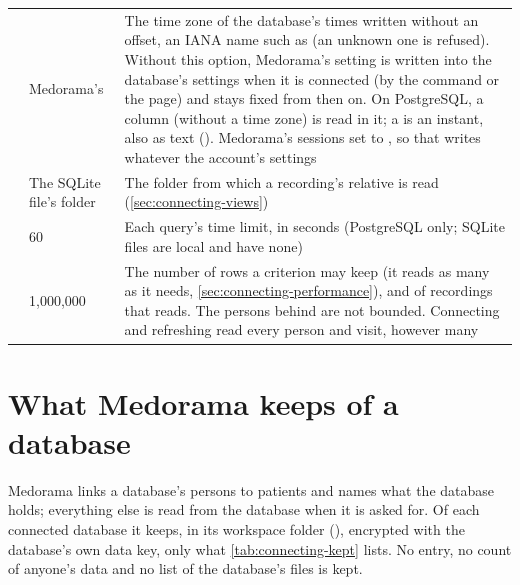 \begin{xltabular}{\linewidth}{@{}P{3.6cm}P{2.6cm}L@{}}
 & Medorama's & The time zone of the database's times written without an
  offset, an IANA name such as  (an unknown one is refused). Without this
  option, Medorama's  setting is written into the database's settings when it is
  connected (by the command or the page) and stays fixed from then on. On PostgreSQL, a
   column (without a time zone) is read in it; a  is an
  instant, also as text (). Medorama's sessions set
   to , so that  writes 
  whatever the account's settings \\
 & The SQLite file's folder & The folder from which a recording's relative
   is read (\cref{sec:connecting-views}) \\
 & 60 & Each query's time limit, in seconds (PostgreSQL only; SQLite files are
  local and have none) \\
 & 1{,}000{,}000 & The number of rows a criterion may keep (it reads as many
  as it needs, \cref{sec:connecting-performance}), and of recordings that  reads. The persons behind  are not bounded. Connecting and
  refreshing read every person and visit, however many \\
\end{xltabular}

\section{What Medorama keeps of a database}
\label{sec:connecting-kept}

Medorama links a database's persons to patients and names what the database holds; everything
else is read from the database when it is asked for. Of each connected database it keeps, in its
workspace folder (), encrypted with the database's own data key, only
what \cref{tab:connecting-kept} lists. No entry, no count of anyone's data and no list of the
database's files is kept.

